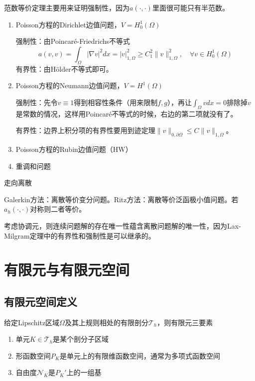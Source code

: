 范数等价定理主要用来证明强制性，因为$a(\cdot, \cdot)$里面很可能只有半范数。

\begin{enumerate}
  \item Poisson方程的Dirichlet边值问题，$V = H_0^1(\Omega)$
  
  强制性：由Poincaré-Friedrichs不等式
  \[
    a(v, v) = \int_{\Omega} |\nabla v|^2 dx = |v|_{1, \Omega}^2 \ge C_{1}^2\|v\|_{1, \Omega}^{2}, \quad \forall v \in H_{0}^{1}(\Omega)
  \]
  有界性：由Hölder不等式即可。

  \item Poisson方程的Neumann边值问题，$V = H^1(\Omega)$

  强制性：先令$v \equiv 1$得到相容性条件（用来限制$f, g$），再让$\int_\Omega v dx = 0$排除掉$v$是常数的情况，这样用Poincaré不等式的时候，右边的第二项就没有了。
  
  有界性：边界上积分项的有界性要用到迹定理$\|v\|_{0, \partial \Omega} \le C\|v\|_{1, \Omega}$。

  \item Poisson方程的Rubin边值问题（HW）
  
  \item 重调和问题
\end{enumerate}

走向离散

Galerkin方法：离散等价变分问题。Ritz方法：离散等价泛函极小值问题。若$a_h(\cdot, \cdot)$对称则二者等价。

考虑协调元，则连续问题解的存在唯一性蕴含离散问题解的唯一性，因为Lax-Milgram定理中的有界性和强制性是可以继承的。

\section{有限元与有限元空间}

\subsection{有限元空间定义}

给定Lipschitz区域$\Omega$及其上规则相处的有限剖分$\mathcal{T}_h$，则有限元三要素
\begin{enumerate}
  \item 单元$K \in \mathcal{T}_h$是某个剖分子区域
  \item 形函数空间$P_K$是单元上的有限维函数空间，通常为多项式函数空间
  \item 自由度$\mathcal{N}_K$是$P_K'$上的一组基
\end{enumerate}

